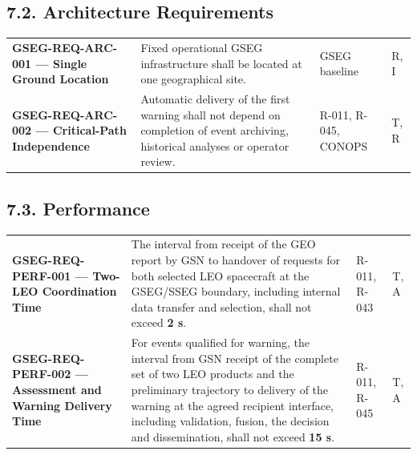 \endgroup

\subsection{7.2. Architecture Requirements}\label{architecture-and-configuration}

\begingroup{}
\begin{longtable}{|P{0.27}|P{0.46}|P{0.16}|P{0.11}|}
\hline{}
 &  &  & \\ \hline
\endhead
\hline\endlastfoot
\textbf{GSEG-REQ-ARC-001 — Single Ground Location} & Fixed operational GSEG infrastructure shall be located at one geographical site. & GSEG baseline & R, I\\ \hline
\textbf{GSEG-REQ-ARC-002 — Critical-Path Independence} & Automatic delivery of the first warning shall not depend on completion of event archiving, historical analyses or operator review. & R-011, R-045, CONOPS & T, R\\*
\end{longtable}
\endgroup

\subsection{7.3. Performance}\label{performance}

\begingroup{}
\begin{longtable}{|P{0.27}|P{0.46}|P{0.16}|P{0.11}|}
\hline{}
 &  &  & \\ \hline
\endhead
\hline\endlastfoot
\textbf{GSEG-REQ-PERF-001 — Two-LEO Coordination Time} & The interval from receipt of the GEO report by GSN to handover of requests for both selected LEO spacecraft at the GSEG/\allowbreak{}SSEG boundary, including internal data transfer and selection, shall not exceed \textbf{2 s}. & R-011, R-043 & T, A\\ \hline
\textbf{GSEG-REQ-PERF-002 — Assessment and Warning Delivery Time} & For events qualified for warning, the interval from GSN receipt of the complete set of two LEO products and the preliminary trajectory to delivery of the warning at the agreed recipient interface, including validation, fusion, the decision and dissemination, shall not exceed \textbf{15 s}. & R-011, R-045 & T, A\\*
\end{longtable}
\endgroup

